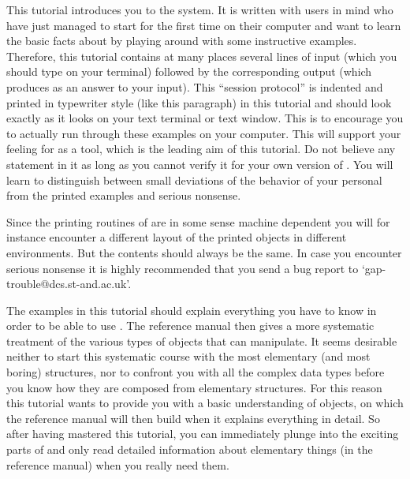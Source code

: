 


This tutorial introduces you to  the {\GAP}  system.  It is written  with
users in mind who have just managed to start {\GAP} for the first time on
their computer and want to learn the basic facts  about {\GAP} by playing
around with some instructive  examples. Therefore, this tutorial contains
at many  places several lines of  input  (which you  should type  on your
terminal) followed by the corresponding output  (which {\GAP} produces as
an answer to your input).
\begintt
This ``session protocol'' is indented and printed in typewriter style
(like this paragraph) in this tutorial and should look exactly as it
looks on your text terminal or text window.
\endtt
This is  to encourage you to actually  run through these examples on your
computer. This will support your  feeling for {\GAP}  as a tool, which is
the leading aim of this  tutorial. Do not believe any  statement in it as
long  as you cannot verify  it for your own  version of  {\GAP}. You will
learn to distinguish  between small  deviations of  the behavior of  your
personal {\GAP} from the printed examples and serious nonsense.

Since the printing routines of {\GAP} are in some sense machine dependent
you will for instance encounter a different layout of the printed objects
in different environments.  But the  contents should always be the  same.
In case you encounter serious nonsense  it is highly recommended that you
send a bug report to `gap-trouble@dcs.st-and.ac.uk'.

The  examples in this  tutorial should explain  everything you have to
know in order  to be able  to use {\GAP}.   The reference  manual then
gives a more systematic treatment of the various types of objects that
{\GAP} can manipulate.   It   seems desirable neither to    start this
systematic  course  with  the   most   elementary (and  most   boring)
structures, nor to confront you with all the complex data types before
you know how  they are composed from  elementary structures.  For this
reason this tutorial  wants to provide  you with a basic understanding
of {\GAP} objects, on which the reference  manual will then build when
it  explains everything in  detail.   So  after having mastered   this
tutorial, you can immediately plunge into the exciting parts of {\GAP}
and  only read detailed  information about  elementary things (in  the
reference manual) when you really need them.

